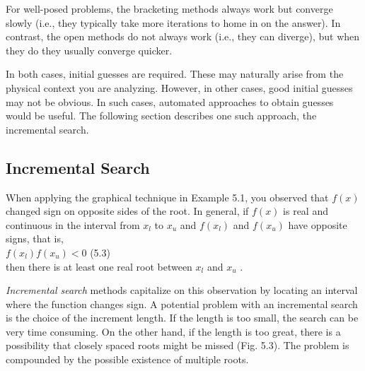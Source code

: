 \documentclass[../main.tex]{subfiles}
\begin{document}
\begin{figure}[hbt!]
\begin{minipage}[b]{.48\textwidth}
    \end{minipage}
\end{figure}
\newpage

For well-posed problems, the bracketing methods always work but converge slowly
(i.e., they typically take more iterations to home in on the answer). In contrast, the open
methods do not always work (i.e., they can diverge), but when they do they usually converge
quicker.

In both cases, initial guesses are required. These may naturally arise from the physical
context you are analyzing. However, in other cases, good initial guesses may not be obvious.
In such cases, automated approaches to obtain guesses would be useful. The following
section describes one such approach, the incremental search.

\subsection{Incremental Search}
\noindent When applying the graphical technique in Example 5.1, you observed that $f(x)$ changed
sign on opposite sides of the root. In general, if $f(x)$ is real and continuous in the interval
from $x_l$ to $x_u$ and $f(x_l)$ and $f(x_u)$ have opposite signs, that is, \\

$f(x_l)f(x_u) < 0$
\hfill (5.3)\\

\noindent then there is at least one real root between $x_l$ and $x_u$ .

\emph{Incremental search} methods capitalize on this observation by locating an interval
where the function changes sign. A potential problem with an incremental search is the
choice of the increment length. If the length is too small, the search can be very time consuming.
On the other hand, if the length is too great, there is a possibility that closely
spaced roots might be missed (Fig. 5.3). The problem is compounded by the possible existence
of multiple roots.
\end{document}
